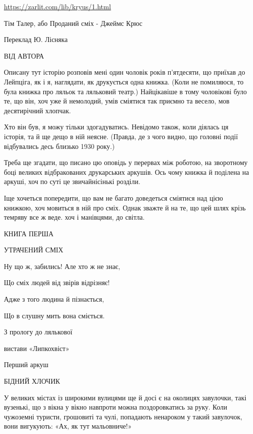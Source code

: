  
 
 
 
 

\url{https://zarlit.com/lib/kryus/1.html}

Тім Талер, або Проданий сміх - Джеймс Крюс

Переклад Ю. Лісняка

ВІД АВТОРА

Описану тут історію розповів мені один чоловік років п'ятдесяти, що приїхав до
Лейпціга, як і я, наглядати, як друкується одна книжка. (Коли не помиляюся, то
була книжка про ляльок та ляльковий театр.) Найцікавіше в тому чоловікові було
те, що він, хоч уже й немолодий, умів сміятися так приємно та весело, мов
десятирічний хлопчак.

Хто він був, я можу тільки здогадуватись. Невідомо також, коли діялась ця
історія, та й ще дещо в ній неясне. (Правда, де з чого видно, що головні події
відбувались десь близько 1930 року.)

Треба ще згадати, що писано цю оповідь у перервах між роботою, на зворотному
боці великих відбракованих друкарських аркушів. Ось чому книжка й поділена на
аркуші, хоч по суті це звичайнісінькі розділи.

Іще хочеться попередити, що вам не багато доведеться сміятися над цією книжкою,
хоч мовиться в ній про сміх. Однак зважте й на те, що цей шлях крізь темряву
все ж веде. хоч і манівцями, до світла.

КНИГА ПЕРША

УТРАЧЕНИЙ СМІХ

Ну що ж, забились! Але хто ж не знає,

Що сміх людей від звірів відрізняє!

Адже з того людина й пізнається,

Що в слушну мить вона сміється.

З прологу до лялькової

вистави «Липкохвіст»

Перший аркуш

БІДНИЙ ХЛОЧИК

У великих містах із широкими вулицями ще й досі є на околицях завулочки, такі вузенькі, що з вікна у вікно навпроти можна поздоровкатись за руку. Коли чужоземні туристи, грошовиті та чулі, попадають ненароком у такий завулочок, вони вигукують: «Ах, як тут мальовниче!»

